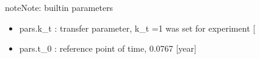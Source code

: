 \documentclass[letterpaper,10pt,english]{sphinxmanual}
\begin{document}
\begin{fulllineitems}
\begin{sphinxadmonition}{note}{Note:}
\sphinxAtStartPar
built\sphinxhyphen{}in parameters
\begin{itemize}
\item {} 
\sphinxAtStartPar
pars.k\_t : transfer parameter, k\_t =1 was set for experiment {[}\sphinxhyphen{}{]}

\item {} 
\sphinxAtStartPar
pars.t\_0 : reference point of time, 0.0767 {[}year{]}

\end{itemize}
\end{sphinxadmonition}

\end{fulllineitems}

\end{document}
